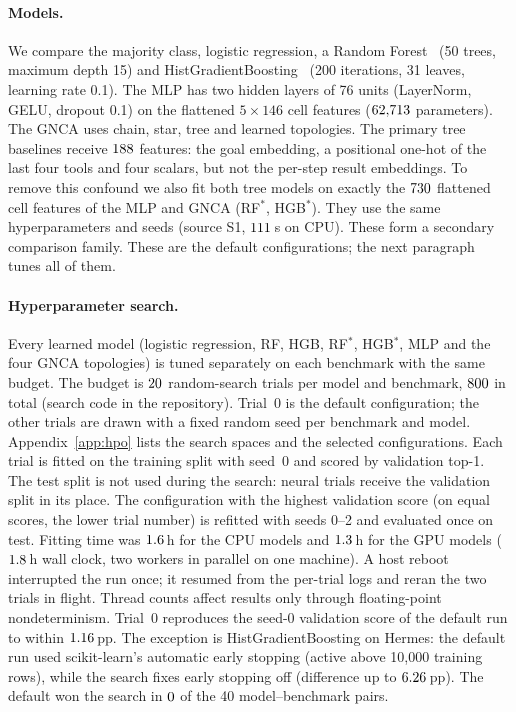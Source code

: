 \documentclass[10pt,twocolumn,letterpaper]{article}
\begin{document}
\paragraph{Models.} We compare the majority class, logistic regression, a Random Forest~\cite{breiman2001random} (50 trees, maximum depth 15) and HistGradientBoosting~\cite{friedman2001greedy} (200 iterations, 31 leaves, learning rate 0.1). The MLP has two hidden layers of 76 units (LayerNorm, GELU, dropout 0.1) on the flattened $5\times146$ cell features ($62{,}713$ parameters). The GNCA uses chain, star, tree and learned topologies. The primary tree baselines receive $188$ features: the goal embedding, a positional one-hot of the last four tools and four scalars, but not the per-step result embeddings. To remove this confound we also fit both tree models on exactly the $730$ flattened cell features of the MLP and GNCA (RF$^\ast$, HGB$^\ast$). They use the same hyperparameters and seeds (source S1, $111$\,s on CPU). These form a secondary comparison family. These are the default configurations; the next paragraph tunes all of them.
\paragraph{Hyperparameter search.} Every learned model (logistic regression, RF, HGB, RF$^\ast$, HGB$^\ast$, MLP and the four GNCA topologies) is tuned separately on each benchmark with the same budget. The budget is $20$ random-search trials per model and benchmark, $800$ in total (search code in the repository). Trial~0 is the default configuration; the other trials are drawn with a fixed random seed per benchmark and model. Appendix~\ref{app:hpo} lists the search spaces and the selected configurations. Each trial is fitted on the training split with seed~0 and scored by validation top-1. The test split is not used during the search: neural trials receive the validation split in its place. The configuration with the highest validation score (on equal scores, the lower trial number) is refitted with seeds 0--2 and evaluated once on test. Fitting time was $1.6$\,h for the CPU models and $1.3$\,h for the GPU models ($1.8$\,h wall clock, two workers in parallel on one machine). A host reboot interrupted the run once; it resumed from the per-trial logs and reran the two trials in flight. Thread counts affect results only through floating-point nondeterminism. Trial~0 reproduces the seed-0 validation score of the default run to within $1.16$\,pp. The exception is HistGradientBoosting on Hermes: the default run used scikit-learn's automatic early stopping (active above 10{,}000 training rows), while the search fixes early stopping off (difference up to $6.26$\,pp). The default won the search in $0$ of the 40 model--benchmark pairs.
\end{document}

